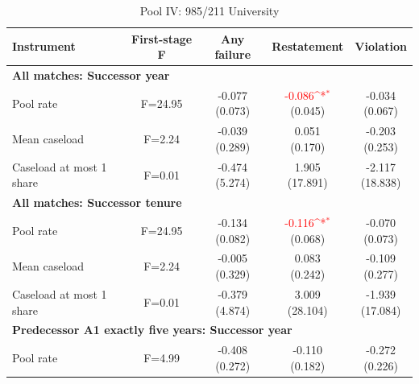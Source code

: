 \begin{table}[htbp]
\footnotesize
\def\sym#1{\ifmmode^{#1}\else\(^{#1}\)\fi}
\centering
\caption{Pool IV: 985/211 University}
\begin{threeparttable}
\begin{tabular}{p{}cccc}
\toprule
Instrument & First-stage F & Any failure & Restatement & Violation \\
\midrule
\multicolumn{5}{l}{\textbf{All matches: Successor year}} \\
Pool rate & F=24.95 & \shortstack{-0.077\\(0.073)} & \shortstack{\textcolor{red}{-0.086\sym{*}}\\(0.045)} & \shortstack{-0.034\\(0.067)} \\
Mean caseload & F=2.24 & \shortstack{-0.039\\(0.289)} & \shortstack{0.051\\(0.170)} & \shortstack{-0.203\\(0.253)} \\
Caseload at most 1 share & F=0.01 & \shortstack{-0.474\\(5.274)} & \shortstack{1.905\\(17.891)} & \shortstack{-2.117\\(18.838)} \\
\multicolumn{5}{l}{\textbf{All matches: Successor tenure}} \\
Pool rate & F=24.95 & \shortstack{-0.134\\(0.082)} & \shortstack{\textcolor{red}{-0.116\sym{*}}\\(0.068)} & \shortstack{-0.070\\(0.073)} \\
Mean caseload & F=2.24 & \shortstack{-0.005\\(0.329)} & \shortstack{0.083\\(0.242)} & \shortstack{-0.109\\(0.277)} \\
Caseload at most 1 share & F=0.01 & \shortstack{-0.379\\(4.874)} & \shortstack{3.009\\(28.104)} & \shortstack{-1.939\\(17.084)} \\
\multicolumn{5}{l}{\textbf{Predecessor A1 exactly five years: Successor year}} \\
Pool rate & F=4.99 & \shortstack{-0.408\\(0.272)} & \shortstack{-0.110\\(0.182)} & \shortstack{-0.272\\(0.226)} \\

\end{tabular}
\end{threeparttable}
\end{table}
